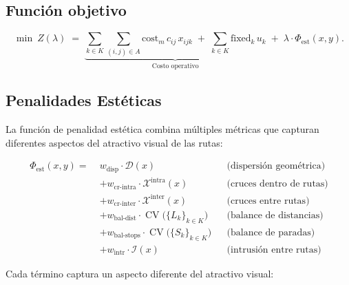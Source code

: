 \documentclass[11pt, a4paper]{article}
\DeclareMathOperator{\CV}{CV}
\begin{document}
\subsection{Función objetivo}
\[
\min\ Z(\lambda)\;=\;\underbrace{\sum_{k\in K}\sum_{(i,j)\in A}\!\!\mathrm{cost}_m\,c_{ij}\,x_{ijk}
\;+\;\sum_{k\in K}\mathrm{fixed}_k\,u_k}_{\text{Costo operativo}}
\;+\;
\lambda\cdot \Phi_{\text{est}}(x,y).
\]

\subsection{Penalidades Estéticas}
La función de penalidad estética combina múltiples métricas que capturan diferentes aspectos del atractivo visual de las rutas:

\begin{align}
\Phi_{\text{est}}(x,y)
=\; &w_{\text{disp}}\cdot \mathcal{D}(x) &&\text{(dispersión geométrica)}\nonumber\\
   &+ w_{\text{cr-intra}}\cdot \mathcal{X}^{\text{intra}}(x) &&\text{(cruces dentro de rutas)}\nonumber\\
   &+ w_{\text{cr-inter}}\cdot \mathcal{X}^{\text{inter}}(x) &&\text{(cruces entre rutas)}\nonumber\\
   &+ w_{\text{bal-dist}}\cdot \CV\!\big(\{L_k\}_{k\in K}\big) &&\text{(balance de distancias)}\nonumber\\
   &+ w_{\text{bal-stops}}\cdot \CV\!\big(\{S_k\}_{k\in K}\big) &&\text{(balance de paradas)}\nonumber\\
   &+ w_{\text{intr}}\cdot \mathcal{I}(x) &&\text{(intrusión entre rutas)} \label{eq:phi}
\end{align}

Cada término captura un aspecto diferente del atractivo visual:
\end{document}
